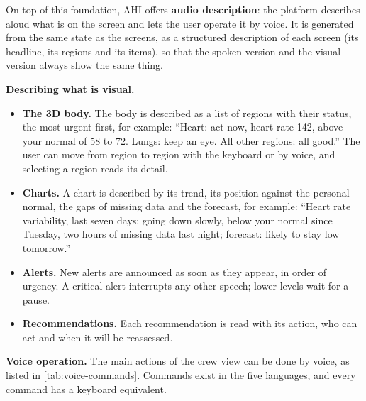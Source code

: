 On top of this foundation, AHI offers \textbf{audio description}: the platform describes aloud what is on the screen and lets the user operate it by voice. It is generated from the same state as the screens, as a structured description of each screen (its headline, its regions and its items), so that the spoken version and the visual version always show the same thing.

\medskip\noindent\textbf{Describing what is visual.}

\begin{itemize}
\item \textbf{The 3D body.} The body is described as a list of regions with their status, the most urgent first, for example: ``Heart: act now, heart rate 142, above your normal of 58 to 72. Lungs: keep an eye. All other regions: all good.'' The user can move from region to region with the keyboard or by voice, and selecting a region reads its detail.
\item \textbf{Charts.} A chart is described by its trend, its position against the personal normal, the gaps of missing data and the forecast, for example: ``Heart rate variability, last seven days: going down slowly, below your normal since Tuesday, two hours of missing data last night; forecast: likely to stay low tomorrow.''
\item \textbf{Alerts.} New alerts are announced as soon as they appear, in order of urgency. A critical alert interrupts any other speech; lower levels wait for a pause.
\item \textbf{Recommendations.} Each recommendation is read with its action, who can act and when it will be reassessed.
\end{itemize}

\medskip\noindent\textbf{Voice operation.} The main actions of the crew view can be done by voice, as listed in \ref{tab:voice-commands}. Commands exist in the five languages, and every command has a keyboard equivalent.

